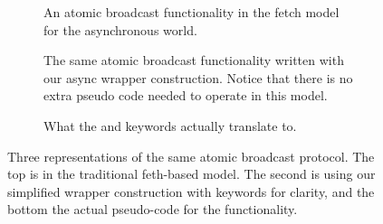 \begin{figure}
\begin{subfigure}{\columnwidth}
	
	\caption{An atomic broadcast functionality in the fetch model for the asynchronous world.}
	\label{fig:atomic:old}
\end{subfigure}
\begin{subfigure}{\columnwidth}
	
	\caption{The same atomic broadcast functionality written with our async wrapper construction. Notice that there is no extra pseudo code needed to operate in this model.}
	\label{fig:atomic:new}
\end{subfigure}
\begin{subfigure}{\columnwidth}
	
	\caption{What the \Eventually and \Leak keywords actually translate to.}
	\label{fig:atomic:real}
\end{subfigure}
\caption{Three representations of the same atomic broadcast protocol. The top is in the traditional feth-based model. The second is using our simplified wrapper construction with keywords for clarity, and the bottom the actual pseudo-code for the functionality.}
\label{fig:fatomic}
\end{figure}

%

%

